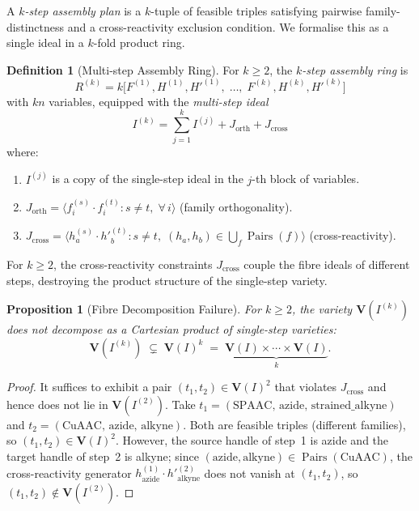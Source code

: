 \documentclass[preprint,12pt]{elsarticle}
\newtheorem{proposition}[theorem]{Proposition}
\theoremstyle{definition}
\newtheorem{definition}[theorem]{Definition}
\theoremstyle{remark}
\newcommand{\kk}{k}
\newcommand{\Var}{\mathbf{V}}
\DeclareMathOperator{\Pairs}{Pairs}
\begin{document}
A \emph{$k$-step assembly plan} is a $k$-tuple of feasible
triples satisfying pairwise family-distinctness and a
cross-reactivity exclusion condition.  We formalise
this as a single ideal in a $k$-fold product ring.

\begin{definition}[Multi-step Assembly Ring]\label{def:multistep}
For $k \geq 2$, the \emph{$k$-step assembly ring} is
\[
  R^{(k)} = \kk\bigl[
    F^{(1)}, H^{(1)}, H'^{(1)}, \;\ldots,\;
    F^{(k)}, H^{(k)}, H'^{(k)}
  \bigr]
\]
with $kn$ variables, equipped with the \emph{multi-step ideal}
\[
  I^{(k)} = \sum_{j=1}^k I^{(j)}
    + J_{\mathrm{orth}} + J_{\mathrm{cross}}
\]
where:
\begin{enumerate}[nosep,label=(\alph*)]
\item $I^{(j)}$ is a copy of the single-step ideal in the
  $j$-th block of variables.
\item $J_{\mathrm{orth}} = \langle f_i^{(s)} \cdot f_i^{(t)} :
  s \neq t,\; \forall\, i \rangle$ (family orthogonality).
\item $J_{\mathrm{cross}} = \langle h_a^{(s)} \cdot h'^{(t)}_b :
  s \neq t,\; (h_a, h_b) \in \bigcup_f \Pairs(f) \rangle$
  (cross-reactivity).
\end{enumerate}
\end{definition}

For $k \geq 2$, the cross-reactivity constraints
$J_{\mathrm{cross}}$ couple the fibre ideals of different
steps, destroying the product structure of the single-step
variety.

\begin{proposition}[Fibre Decomposition Failure]\label{prop:fibre-break}
For $k \geq 2$, the variety $\Var(I^{(k)})$ does not
decompose as a Cartesian product of single-step varieties:
\[
  \Var(I^{(k)}) \;\subsetneq\;
  \Var(I)^k \;=\;
  \underbrace{\Var(I) \times \cdots \times \Var(I)}_{k}.
\]
\end{proposition}

\begin{proof}
It suffices to exhibit a pair $(t_1, t_2) \in \Var(I)^2$ that
violates $J_{\mathrm{cross}}$ and hence does not lie in
$\Var(I^{(2)})$.  Take
$t_1 = (\mathrm{SPAAC},\, \mathrm{azide},\, \mathrm{strained\_alkyne})$
and
$t_2 = (\mathrm{CuAAC},\, \mathrm{azide},\, \mathrm{alkyne})$.
Both are feasible triples (different families), so
$(t_1, t_2) \in \Var(I)^2$.  However, the source handle of step~1
is azide and the target handle of step~2 is alkyne; since
$(\mathrm{azide}, \mathrm{alkyne}) \in \Pairs(\mathrm{CuAAC})$,
the cross-reactivity generator
$h_{\mathrm{azide}}^{(1)} \cdot h'^{(2)}_{\mathrm{alkyne}}$
does not vanish at $(t_1, t_2)$, so
$(t_1, t_2) \notin \Var(I^{(2)})$.
\end{proof}
\end{document}
